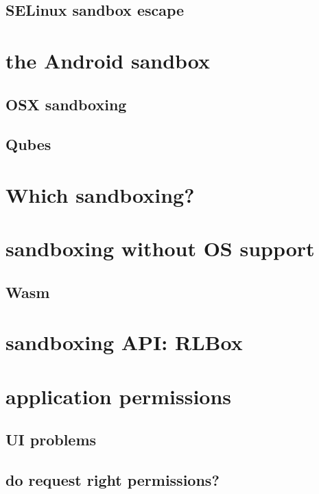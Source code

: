 \subsection{SELinux sandbox escape}

\section{the Android sandbox}



\subsection{OSX sandboxing}

\subsection{Qubes}


\section{Which sandboxing?}


\section{sandboxing without OS support}


\subsection{Wasm}



\section{sandboxing API: RLBox}


\section{application permissions}


\subsection{UI problems}


\subsection{do request right permissions?}


